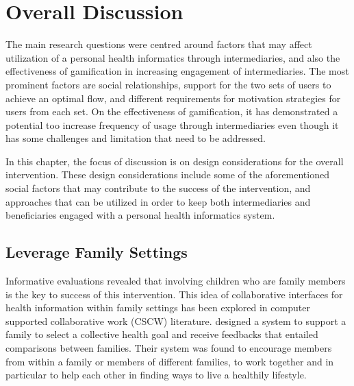 
\chapter{Overall Discussion} %

\label{discussionchapter} %


The main research questions were centred around factors that may affect utilization of a personal health informatics through intermediaries, and also the effectiveness of gamification in increasing engagement of intermediaries. The most prominent factors are social relationships, support for the two sets of users to achieve an optimal flow, and  different requirements for motivation strategies for users from each set. On the effectiveness of gamification, it has demonstrated a potential too increase frequency of usage through intermediaries even though it has some challenges and limitation that need to be addressed.
  
In this chapter, the focus of discussion is on design considerations for the overall intervention. These design considerations include some of the aforementioned social factors that may contribute to the success of the intervention, and approaches that can be utilized in order to keep both intermediaries and beneficiaries engaged with a personal health informatics system.
 
\section{Leverage Family Settings}
Informative evaluations revealed that involving children who are family members is the key to success of this intervention. This idea of collaborative interfaces for health information within family settings has been explored in computer supported collaborative work (CSCW) literature. \cite{colineau2011motivating} designed a system to support a family to select a collective health goal and receive feedbacks that entailed comparisons between families. Their system was found to encourage members from within a family or members of different families, to work together and in particular to help each other in finding ways to live a healthily lifestyle. 

